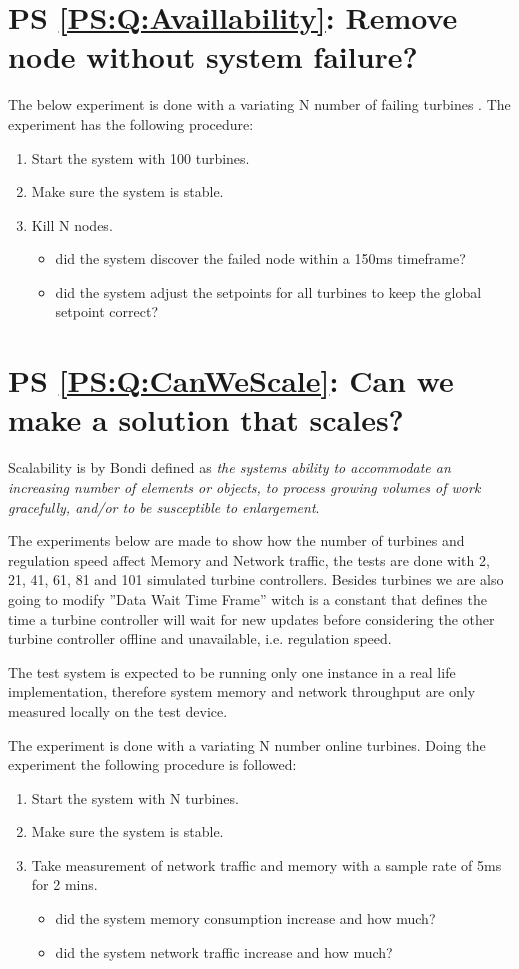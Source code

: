 \section{PS \ref{PS:Q:Availlability}: Remove node without system failure?}

The below experiment is done with a variating N number of failing turbines \turbineNumbers.
The experiment has the following procedure:
\begin{enumerate}
	\item Start the system with 100 turbines.
	\item Make sure the system is stable.
	\item Kill N nodes.
	\begin{itemize}
		\item did the system discover the failed node within a 150ms timeframe?
		\item did the system adjust the setpoints for all turbines to keep the global setpoint correct?
	\end{itemize}
\end{enumerate}


\section{PS \ref{PS:Q:CanWeScale}: Can we make a solution that scales?}
Scalability is by Bondi\cite{Bondi:2000:CSI:350391.350432} defined as \textit{the systems ability to accommodate an increasing number of elements or objects, to process growing volumes of work gracefully, and/or to be susceptible to enlargement}. 

The experiments below are made to show how the number of turbines and regulation speed affect Memory and Network traffic, the tests are done with 2, 21, 41, 61, 81 and 101 simulated turbine controllers. Besides turbines we are also going to modify ''Data Wait Time Frame'' witch is a constant that defines the time a turbine controller will wait for new updates before considering the other turbine controller offline and unavailable, i.e. regulation speed.

The test system is expected to be running only one instance in a real life implementation, therefore system memory and network throughput are only measured locally on the test device.


The experiment is done with a variating N number online turbines.
Doing the experiment the following procedure is followed:
\begin{enumerate}
	\item Start the system with N turbines.
	\item Make sure the system is stable.
	\item Take measurement of network traffic and memory with a sample rate of 5ms for 2 mins.
	\begin{itemize}
		\item did the system memory consumption increase and how much?
		\item did the system network traffic increase and how much?
	\end{itemize}
\end{enumerate}


